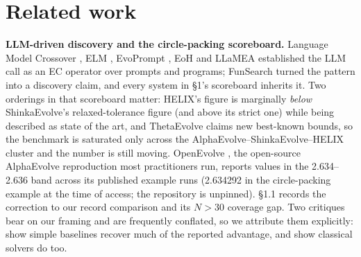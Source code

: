 \section{Related work}

\textbf{LLM-driven discovery and the circle-packing scoreboard.} Language Model Crossover
\citep{meyerson2024languagemodelcrossovervariation}, ELM \citep{lehman2022evolutionlargemodels}, EvoPrompt \citep{guo2024evoprompt}, EoH \citep{liu2024eoh} and LLaMEA \citep{vanstein2025llamealargelanguagemodel}
established the LLM call as an EC operator over prompts and programs; FunSearch turned the
pattern into a discovery claim, and every system in \S1's scoreboard inherits it. Two orderings
in that scoreboard matter: HELIX's figure is marginally \emph{below} ShinkaEvolve's relaxed-tolerance figure (and above its strict one) while being
described as state of the art, and ThetaEvolve claims new best-known bounds, so the benchmark is
saturated only across the AlphaEvolve--ShinkaEvolve--HELIX cluster and the number is still moving.
OpenEvolve \citep{sharma2025openevolve}, the open-source AlphaEvolve reproduction most practitioners run, reports values in the 2.634--2.636 band across its published example runs (2.634292 in the circle-packing example at the time of access; the repository is unpinned).
\S1.1 records the correction to our record comparison and its $N > 30$ coverage gap. Two critiques
bear on our framing and are frequently conflated, so we attribute them explicitly: \citet{gideoni2026simplebaselinescompetitivecode}
show simple baselines recover much of the reported advantage, and \citet{berthold2026outoftheboxglobaloptimizationpacking}
show classical solvers do too.

